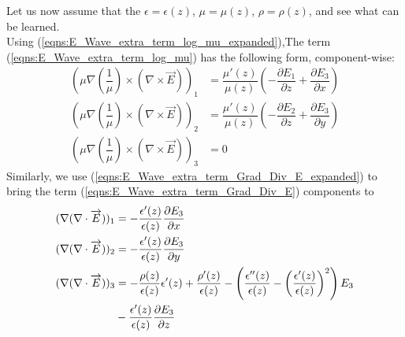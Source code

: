\documentclass[12pt,twoside]{report}
\begin{document}
Let us now assume that the $\epsilon = \epsilon(z)$, $\mu=\mu(z)$, $\rho = \rho(z)$, and see what can be learned.\\
Using (\ref{eqns:E_Wave_extra_term_log_mu_expanded}),The term (\ref{eqns:E_Wave_extra_term_log_mu}) has the following form, component-wise:
\begin{subequations}
\begin{align}
\left(  \mu \nabla \left(\dfrac{1}{\mu} \right)  \times \left(\nabla \times \overrightarrow{E} \right)\right)_1 &= \dfrac{\mu'(z)}{\mu(z)}\left( -\dfrac{\partial E_1}{\partial z} + \dfrac{\partial E_3}{\partial x}\right) \label{eqns:LogTerm_z_only_Eq1}\\
\left(  \mu \nabla \left( \dfrac{1}{\mu} \right)  \times \left(\nabla \times \overrightarrow{E} \right)\right)_2 &= \dfrac{\mu'(z)}{\mu(z)}\left( -\dfrac{\partial E_2}{\partial z} + \dfrac{\partial E_3}{\partial y}\right) \label{eqns:LogTerm_z_only_Eq2} \\
\left(  \mu \nabla \left( \dfrac{1}{\mu} \right)  \times \left(\nabla \times \overrightarrow{E} \right)\right)_3 &= 0 \label{eqns:LogTerm_z_only_Eq3}
\end{align}
\end{subequations}
Similarly, we use (\ref{eqns:E_Wave_extra_term_Grad_Div_E_expanded}) to bring the term (\ref{eqns:E_Wave_extra_term_Grad_Div_E}) components to
\begin{subequations}
\begin{align}
(\nabla (\nabla \cdot \overrightarrow{E}))_1 &= -\dfrac{\epsilon'(z)}{\epsilon(z)} \dfrac{\partial E_3}{\partial x}	\label{eqns:GradDivTerm_z_only_Eq1}\\
(\nabla (\nabla \cdot \overrightarrow{E}))_2 &= -\dfrac{\epsilon'(z)}{\epsilon(z)} \dfrac{\partial E_3}{\partial y} \label{eqns:GradDivTerm_z_only_Eq2}\\
(\nabla (\nabla \cdot \overrightarrow{E}))_3 &= -\dfrac{\rho(z)}{\epsilon(z)}\epsilon'(z) + \dfrac{\rho'(z)}{\epsilon(z)}-\left( \dfrac{\epsilon''(z)}{\epsilon(z)}-\left( \dfrac{\epsilon'(z)}{\epsilon(z)}\right)^2 \right)E_3 \label{eqns:GradDivTerm_z_only_Eq3}\\
& -\dfrac{\epsilon'(z)}{\epsilon(z)}\dfrac{\partial E_3}{\partial z}	\notag
\end{align}
\end{subequations}
\end{document}
